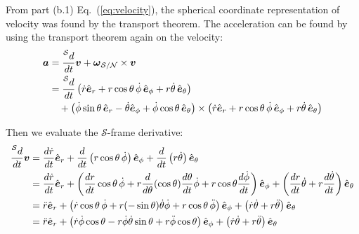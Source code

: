 \documentclass[titlepage]{article}
\begin{document}
From part (b.1) Eq.~(\ref{eq:velocity}), the spherical coordinate representation of velocity was found by the transport theorem. The acceleration can be found by using the transport theorem again on the velocity:
\begin{equation}
	\begin{split}
		\boldsymbol{a}&=\frac{\prescript{\mathcal{S}}{}{d}}{dt}\boldsymbol{v}+\boldsymbol{\omega}_{\mathcal{S}/\mathcal{N}}\times\boldsymbol{v} \\
		&=\frac{\prescript{\mathcal{S}}{}{d}}{dt}\left(\dot{r}\hat{\boldsymbol{e}}_r+r\cos\theta\,\dot{\phi}\,\hat{\boldsymbol{e}}_\phi+r\dot{\theta}\,\hat{\boldsymbol{e}}_\theta\right) \\
		&\quad+\left(\dot{\phi}\sin\theta\,\hat{\boldsymbol{e}}_r-\dot{\theta}\hat{\boldsymbol{e}}_\phi+\dot{\phi}\cos\theta\,\hat{\boldsymbol{e}}_\theta\right)\times\left(\dot{r}\hat{\boldsymbol{e}}_r+r\cos\theta\,\dot{\phi}\,\hat{\boldsymbol{e}}_\phi+r\dot{\theta}\,\hat{\boldsymbol{e}}_\theta\right)
	\end{split}
\end{equation}

Then we evaluate the $\mathcal{S}$-frame derivative:
\begin{equation}
	\begin{split}
		\frac{\prescript{\mathcal{S}}{}{d}}{dt}\boldsymbol{v}&=\frac{d\dot{r}}{dt}\hat{\boldsymbol{e}}_r+\frac{d}{dt}\left(r\cos\theta\,\dot{\phi}\right)\hat{\boldsymbol{e}}_\phi+\frac{d}{dt}\left(r\dot{\theta}\right)\hat{\boldsymbol{e}}_\theta \\
		&=\frac{d\dot{r}}{dt}\hat{\boldsymbol{e}}_r+\left(\frac{dr}{dt}\cos\theta\,\dot{\phi}+r\frac{d}{d\theta}(\cos\theta)\frac{d\theta}{dt}\dot{\phi}+r\cos\theta\frac{d\dot{\phi}}{dt}\right)\hat{\boldsymbol{e}}_\phi+\left(\frac{dr}{dt}\dot{\theta}+r\frac{d\dot{\theta}}{dt}\right)\hat{\boldsymbol{e}}_\theta \\
		&=\ddot{r}\hat{\boldsymbol{e}}_r+\left(\dot{r}\cos\theta\,\dot{\phi}+r(-\sin\theta)\dot{\theta}\dot{\phi}+r\cos\theta\,\ddot{\phi}\right)\hat{\boldsymbol{e}}_\phi+\left(\dot{r}\dot{\theta}+r\ddot{\theta}\right)\hat{\boldsymbol{e}}_\theta \\
		&=\ddot{r}\hat{\boldsymbol{e}}_r+\left(\dot{r}\dot{\phi}\cos\theta-r\dot{\phi}\dot{\theta}\sin\theta+r\ddot{\phi}\cos\theta\right)\hat{\boldsymbol{e}}_\phi+\left(\dot{r}\dot{\theta}+r\ddot{\theta}\right)\hat{\boldsymbol{e}}_\theta
	\end{split}
\end{equation}
\end{document}
